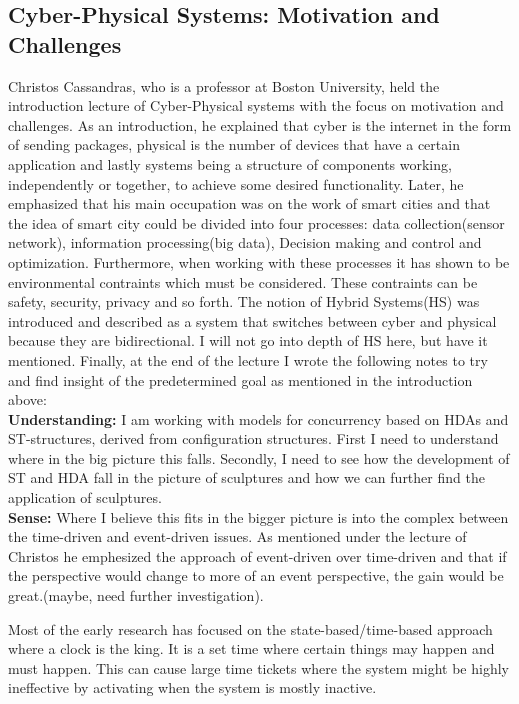 \documentclass[9pt, english, a4paper]{article}
\theoremstyle{definition}
\begin{document}
\subsection{Cyber-Physical Systems: Motivation and Challenges}
	
	Christos Cassandras, who is a professor at Boston University, held the introduction lecture of Cyber-Physical systems with the focus on motivation and challenges. As an introduction, he explained that cyber is the internet in the form of sending packages, physical is the number of devices that have a certain application and lastly systems being a structure of components working, independently or together, to achieve some desired functionality. Later, he emphasized that his main occupation was on the work of smart cities and that the idea of smart city could be divided into four processes: data collection(sensor network), information processing(big data), Decision making and control and optimization. Furthermore, when working with these processes it has shown to be environmental contraints which must be considered. These contraints can be safety, security, privacy and so forth. The notion of Hybrid Systems(HS) was introduced and described as a system that switches between cyber and physical because they are bidirectional. I will not go into depth of HS here, but have it mentioned. Finally, at the end of the lecture I wrote the following notes to try and find insight of the predetermined goal as mentioned in the introduction above:\\

	\noindent \textbf{Understanding:} I am working with models for concurrency based on HDAs and ST-structures, derived from configuration structures. First I need to understand where in the big picture this falls. Secondly, I need to see how the development of ST and HDA fall in the picture of sculptures and how we can further find the application of sculptures.\\

	\noindent \textbf{Sense:} Where I believe this fits in the bigger picture is into the complex between the time-driven and event-driven issues. As mentioned under the lecture of Christos he emphesized the approach of event-driven over time-driven and that if the perspective would change to more of an event perspective, the gain would be great.(maybe, need further investigation).

	Most of the early research has focused on the state-based/time-based approach where a clock is the king. It is a set time where certain things may happen and must happen. This can cause large time tickets where the system might be highly ineffective by activating when the system is mostly inactive.
\end{document}
